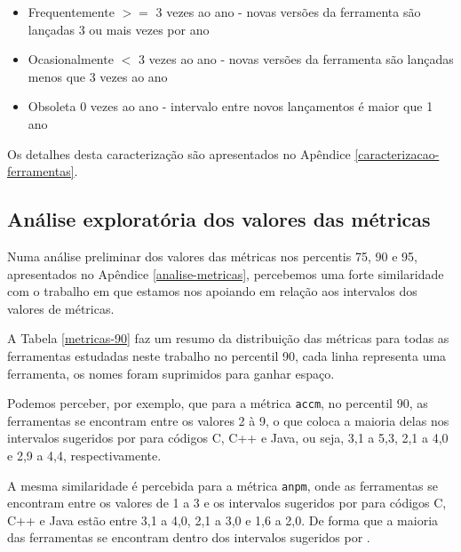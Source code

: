\begin{itemize}
  \item Frequentemente $>=$ 3 vezes ao ano - novas versões da ferramenta são lançadas 3 ou mais vezes por ano
  \item Ocasionalmente $<$ 3 vezes ao ano - novas versões da ferramenta são lançadas menos que 3 vezes ao ano
  \item Obsoleta 0 vezes ao ano - intervalo entre novos lançamentos é maior que 1 ano
\end{itemize}

Os detalhes desta caracterização são apresentados no Apêndice \ref{caracterizacao-ferramentas}.

\subsection{Análise exploratória dos valores das métricas}

Numa análise preliminar dos valores das métricas nos percentis 75, 90 e 95,
apresentados no Apêndice \ref{analise-metricas}, percebemos uma forte
similaridade com o trabalho em que estamos nos apoiando \cite{Meirelles2013}
em relação aos intervalos dos valores de métricas.

A Tabela \ref{metricas-90} faz um resumo da distribuição das métricas para todas
as ferramentas estudadas neste trabalho no
percentil 90, cada linha
representa uma ferramenta, os nomes foram suprimidos para ganhar
espaço.


Podemos perceber, por exemplo, que para a métrica \texttt{accm}, no percentil 90,
as ferramentas se encontram entre os valores 2 à 9, o que coloca a maioria
delas nos intervalos sugeridos por \cite{Meirelles2013} para
códigos C, C++ e Java, ou seja, 3,1 a 5,3, 2,1 a 4,0 e 2,9 a 4,4,
respectivamente.

A mesma similaridade é percebida para a métrica \texttt{anpm}, onde as
ferramentas se encontram entre os valores de 1 a 3 e os intervalos sugeridos por
\cite{Meirelles2013} para códigos C, C++ e Java estão entre 3,1 a 4,0, 2,1 a
3,0 e 1,6 a 2,0. De forma que a maioria das ferramentas se encontram dentro
dos intervalos sugeridos por \cite{Meirelles2013}.

